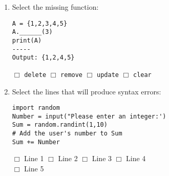 \documentclass[11pt]{report}
\begin{document}
\begin{enumerate}
\item Select the missing function:

\begin{verbatim}
A = {1,2,3,4,5}
A.______(3)
print(A)
-----
Output: {1,2,4,5}
\end{verbatim}
$\Box$ {\tt delete} \hspace{2em} $\Box$ {\tt remove} \hspace{2em} $\Box$ {\tt update} \hspace{2em} $\Box$ {\tt clear}

\item Select the lines that will produce syntax errors:

\begin{verbatim}
import random
Number = input("Please enter an integer:')
Sum = random.randint(1,10)
# Add the user's number to Sum
Sum += Number
\end{verbatim}
$\Box$ Line 1 \hspace{3em} $\Box$ Line 2 \hspace{3em} $\Box$ Line 3 \hspace{3em}
$\Box$ Line 4\\
$\Box$ Line 5

\end{enumerate}
\end{document}
